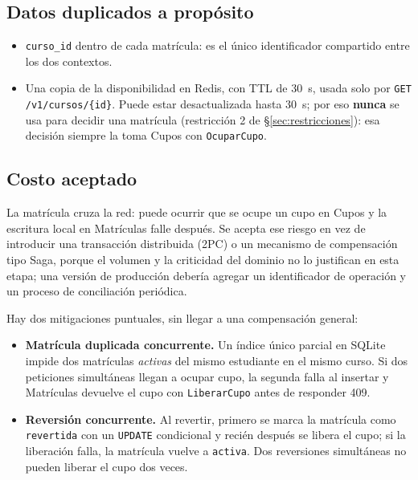 \documentclass[11pt,spanish]{article}
\begin{document}
\subsection{Datos duplicados a propósito}

\begin{itemize}
    \item \texttt{curso\_id} dentro de cada matrícula: es el único identificador compartido entre los dos contextos.
    \item Una copia de la disponibilidad en Redis, con TTL de 30~s, usada solo por \texttt{GET /v1/cursos/\{id\}}. Puede estar desactualizada hasta 30~s; por eso \textbf{nunca} se usa para decidir una matrícula (restricción 2 de \S\ref{sec:restricciones}): esa decisión siempre la toma Cupos con \texttt{OcuparCupo}.
\end{itemize}

\subsection{Costo aceptado}\label{sec:costo-frontera}

La matrícula cruza la red: puede ocurrir que se ocupe un cupo en Cupos y la escritura local en Matrículas falle después. Se acepta ese riesgo en vez de introducir una transacción distribuida (2PC) o un mecanismo de compensación tipo Saga, porque el volumen y la criticidad del dominio no lo justifican en esta etapa; una versión de producción debería agregar un identificador de operación y un proceso de conciliación periódica.

Hay dos mitigaciones puntuales, sin llegar a una compensación general:

\begin{itemize}
    \item \textbf{Matrícula duplicada concurrente.} Un índice único parcial en SQLite impide dos matrículas \emph{activas} del mismo estudiante en el mismo curso. Si dos peticiones simultáneas llegan a ocupar cupo, la segunda falla al insertar y Matrículas devuelve el cupo con \texttt{LiberarCupo} antes de responder 409.
    \item \textbf{Reversión concurrente.} Al revertir, primero se marca la matrícula como \texttt{revertida} con un \texttt{UPDATE} condicional y recién después se libera el cupo; si la liberación falla, la matrícula vuelve a \texttt{activa}. Dos reversiones simultáneas no pueden liberar el cupo dos veces.
\end{itemize}
\end{document}
